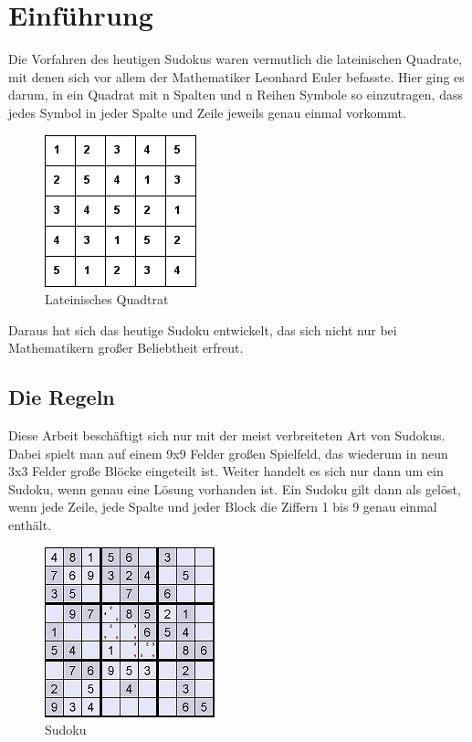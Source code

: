 \documentclass[accentcolor=tud6b,11pt,paper=a4]{tudreport}
\begin{document}

\chapter{Einf\"uhrung}
Die Vorfahren des heutigen Sudokus waren vermutlich die lateinischen Quadrate, mit denen sich vor allem der Mathematiker Leonhard Euler befasste. Hier ging es darum, in ein Quadrat mit n Spalten und n Reihen Symbole so einzutragen, dass jedes Symbol in jeder Spalte und Zeile jeweils genau einmal vorkommt.

\begin{figure}[htbp]
\begin{center}
\includegraphics{./img/lat_quadrat.png}
\caption{Lateinisches Quadtrat}
\end{center}
\end{figure}

Daraus hat sich das heutige Sudoku entwickelt, das sich nicht nur bei Mathematikern großer Beliebtheit erfreut.

\section{Die Regeln}
Diese Arbeit besch\"aftigt sich nur mit der meist verbreiteten Art von Sudokus. Dabei spielt man auf einem 9x9 Felder großen Spielfeld, das wiederum in neun 3x3 Felder große Bl\"ocke eingeteilt ist. Weiter handelt es sich nur dann um ein Sudoku, wenn genau eine L\"osung vorhanden ist.
Ein Sudoku gilt dann als gel\"ost, wenn jede Zeile, jede Spalte und jeder Block die Ziffern 1 bis 9 genau einmal enth\"alt.\\
\begin{figure}[h]
\begin{center}
\includegraphics{./img/sudoku.jpg}
\caption{Sudoku}
\end{center}
\end{figure}
\end{document}
